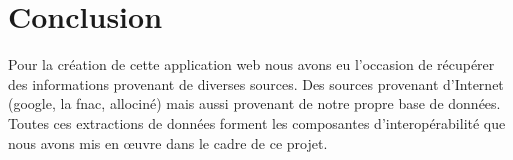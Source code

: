 \documentclass[10pt,a4paper]{report}
\begin{document}

\section{Conclusion}
\begin{flushleft}
Pour la création de cette application web nous avons eu l'occasion de récupérer des informations provenant de diverses sources. Des sources provenant d'Internet (google, la fnac, allociné) mais aussi provenant de notre propre base de données. Toutes ces extractions de données forment les composantes d'interopérabilité que nous avons mis en œuvre dans le cadre de ce projet.
\end{flushleft}
\end{document}

